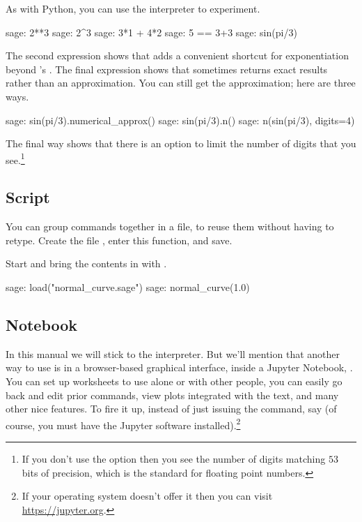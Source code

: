 As with Python, you can use the interpreter to experiment.
\begin{sagecommandline}
sage: 2**3                                                                      
sage: 2^3
sage: 3*1 + 4*2
sage: 5 == 3+3
sage: sin(pi/3)
\end{sagecommandline}
The second expression 
shows that \Sage{} adds a convenient shortcut for exponentiation beyond
\python's .
The final expression
shows that \Sage{} sometimes returns exact results rather than an
approximation.
You can still get the approximation; here are three ways.
\begin{sagecommandline}
sage: sin(pi/3).numerical_approx()
sage: sin(pi/3).n()
sage: n(sin(pi/3), digits=4)  
\end{sagecommandline}
The final way shows that there is an option to limit the number of digits
that you see.\footnote{%
  If you don't use the option then you see the number of digits matching 
  $53$ bits of precision, which is the standard for  
  floating point numbers.}


\subsection{Script}
You can group \Sage{} commands together in a file, 
to reuse them without having to retype.
Create the file , 
enter this function, and save.

Start \Sage{} and bring the contents in with .
\begin{sagecommandline}
sage: load("normal_curve.sage")
sage: normal_curve(1.0)
\end{sagecommandline}


\subsection{Notebook}
In this manual we will stick to the interpreter.
But we'll mention that another way to use \Sage{} is in   
a browser-based graphical interface, 
inside a Jupyter Notebook, \cite{JupyterTeam19}.
You can set up
worksheets to use alone or with other people, you can easily
go back and edit prior commands, view plots integrated with the text, 
and many other nice features.
To fire it up, instead of just issuing the 
command, say
(of course, you must have the Jupyter software
installed).\footnote{%
  If your operating system doesn't offer it then you can 
  visit \protect\url{https://jupyter.org}.}
\endinput
